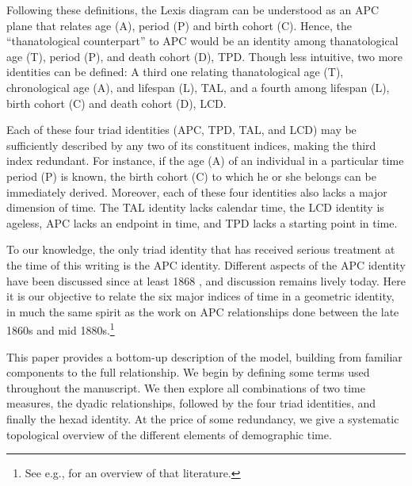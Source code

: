 \documentclass[11pt,oneside,a4paper]{article} %
\begin{document}
Following these definitions, the Lexis diagram can be understood as an APC plane that relates age (A), period (P) and birth cohort (C). Hence, the ``thanatological counterpart'' to APC would be an identity among thanatological age (T), period (P), and death cohort (D), TPD. Though less intuitive, two more identities can be defined: A third one relating thanatological age (T), chronological age (A), and lifespan (L), TAL, and a fourth among lifespan (L), birth cohort (C) and death cohort (D), LCD.

Each of these four triad identities (APC, TPD, TAL, and LCD) may be sufficiently described by any two of its constituent indices, making the third index redundant. For instance, if the age (A) of an individual in a particular time period (P) is known, the birth cohort (C) to which he or she belongs can be immediately derived. Moreover, each of these four identities also lacks a major dimension of time. The TAL identity lacks calendar time, the LCD identity is ageless, APC lacks an endpoint in time, and TPD lacks a starting point in time.

To our knowledge, the only triad identity that has received serious
treatment at the time of this writing is the APC identity. Different
aspects of the APC identity have been discussed since at least 1868
\citep{knapp1868ermittlung}, and discussion remains lively today. Here it is our
objective to relate the six major indices of time in a geometric identity, in
much the same spirit as the work on APC relationships done between the late
1860s and mid 1880s.\footnote{See e.g., \citet{keiding2011age} for an overview of that literature.} 

This paper provides a bottom-up description of the model, building from familiar
components to the full relationship. We begin by defining some terms used
throughout the manuscript. We then explore all combinations of two time
measures, the dyadic relationships, followed by the four triad identities, and
finally the hexad identity. At the price of some redundancy, we give a systematic topological overview of the
different elements of demographic time. 
\end{document}
